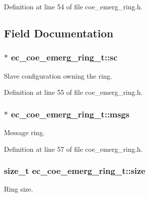 \-Definition at line 54 of file coe\-\_\-emerg\-\_\-ring.\-h.



\subsection{\-Field \-Documentation}
\subsubsection[{sc}]{$\ast$ {\bf ec\-\_\-coe\-\_\-emerg\-\_\-ring\-\_\-t\-::sc}}\label{structec__coe__emerg__ring__t_a797c7475bf92dd29e31802e6501a8c47}


\-Slave configuration owning the ring. 



\-Definition at line 55 of file coe\-\_\-emerg\-\_\-ring.\-h.

\subsubsection[{msgs}]{$\ast$ {\bf ec\-\_\-coe\-\_\-emerg\-\_\-ring\-\_\-t\-::msgs}}\label{structec__coe__emerg__ring__t_af505c9c347ce9a49448a36252dde0f45}


\-Message ring. 



\-Definition at line 57 of file coe\-\_\-emerg\-\_\-ring.\-h.

\subsubsection[{size}]{\setlength{\rightskip}{0pt plus 5cm}size\-\_\-t {\bf ec\-\_\-coe\-\_\-emerg\-\_\-ring\-\_\-t\-::size}}\label{structec__coe__emerg__ring__t_a26777c2390fb1a329e0866f7954c447b}


\-Ring size. 



